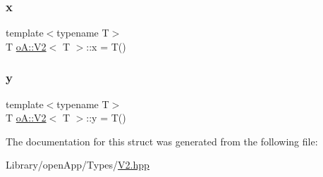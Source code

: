 \subsubsection{\texorpdfstring{x}{x}}
{\footnotesize\ttfamily template$<$typename T$>$ \\
T \mbox{\hyperlink{structo_a_1_1_v2}{o\+A\+::\+V2}}$<$ T $>$\+::x = T()}

\mbox{\label{structo_a_1_1_v2_a9437a06af6b8e5407e361b6bfc067225}} 
\subsubsection{\texorpdfstring{y}{y}}
{\footnotesize\ttfamily template$<$typename T$>$ \\
T \mbox{\hyperlink{structo_a_1_1_v2}{o\+A\+::\+V2}}$<$ T $>$\+::y = T()}



The documentation for this struct was generated from the following file\+:\begin{DoxyCompactItemize}
\item 
Library/open\+App/\+Types/\mbox{\hyperlink{_v2_8hpp}{V2.\+hpp}}\end{DoxyCompactItemize}
